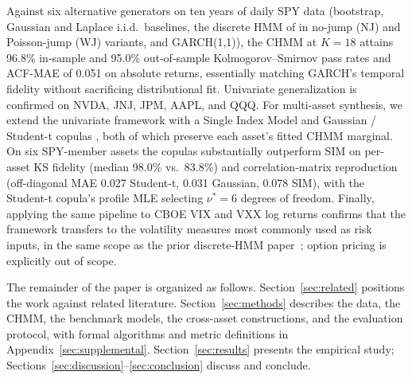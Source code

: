 Against six alternative generators on ten years of daily SPY data (bootstrap, Gaussian and Laplace i.i.d.\ baselines, the discrete HMM of \citet{alswaidan2026hybrid} in no-jump (NJ) and Poisson-jump (WJ) variants, and GARCH(1,1)), the CHMM at $K = 18$ attains 96.8\% in-sample and 95.0\% out-of-sample Kolmogorov--Smirnov pass rates and ACF-MAE of 0.051 on absolute returns, essentially matching GARCH's temporal fidelity without sacrificing distributional fit.
Univariate generalization is confirmed on NVDA, JNJ, JPM, AAPL, and QQQ.
For multi-asset synthesis, we extend the univariate framework with a Single Index Model \cite{sharpe1963simplified} and Gaussian / Student-t copulas \cite{sklar1959fonctions, demarta2005tcopula, mcneil2015quantitative}, both of which preserve each asset's fitted CHMM marginal.
On six SPY-member assets the copulas substantially outperform SIM on per-asset KS fidelity (median 98.0\% vs.\ 83.8\%) and correlation-matrix reproduction (off-diagonal MAE 0.027 Student-t, 0.031 Gaussian, 0.078 SIM), with the Student-t copula's profile MLE selecting $\nu^{*} = 6$ degrees of freedom.
Finally, applying the same pipeline to CBOE VIX and VXX log returns confirms that the framework transfers to the volatility measures most commonly used as risk inputs, in the same scope as the prior discrete-HMM paper~\citep{alswaidan2026hybrid}; option pricing is explicitly out of scope.

The remainder of the paper is organized as follows.
Section~\ref{sec:related} positions the work against related literature.
Section~\ref{sec:methods} describes the data, the CHMM, the benchmark models, the cross-asset constructions, and the evaluation protocol, with formal algorithms and metric definitions in Appendix~\ref{sec:supplemental}.
Section~\ref{sec:results} presents the empirical study; Sections~\ref{sec:discussion}--\ref{sec:conclusion} discuss and conclude.
